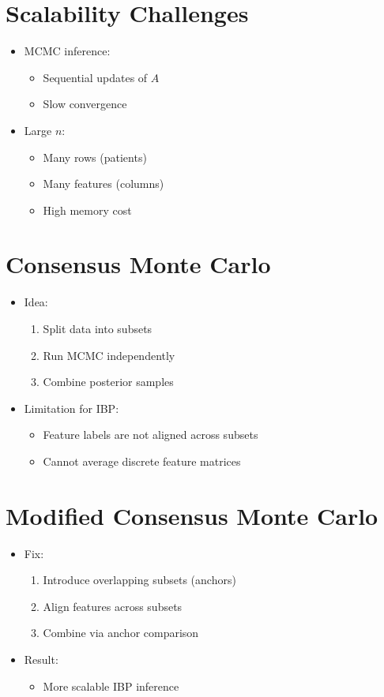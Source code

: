 \documentclass[12pt,oneside]{book}
\numberwithin{equation}{section}
\theoremstyle{definition}
\theoremstyle{plain}
\theoremstyle{remark}
\begin{document}
\section{Scalability Challenges}

\begin{itemize}
\item MCMC inference:
\begin{itemize}
\item Sequential updates of $A$
\item Slow convergence
\end{itemize}

\item Large $n$:
\begin{itemize}
\item Many rows (patients)
\item Many features (columns)
\item High memory cost
\end{itemize}
\end{itemize}

\section{Consensus Monte Carlo}

\begin{itemize}
\item Idea:
\begin{enumerate}
\item Split data into subsets
\item Run MCMC independently
\item Combine posterior samples
\end{enumerate}

\item Limitation for IBP:
\begin{itemize}
\item Feature labels are not aligned across subsets
\item Cannot average discrete feature matrices
\end{itemize}
\end{itemize}

\section{Modified Consensus Monte Carlo}

\begin{itemize}
\item Fix:
\begin{enumerate}
\item Introduce overlapping subsets (anchors)
\item Align features across subsets
\item Combine via anchor comparison
\end{enumerate}

\item Result:
\begin{itemize}
\item More scalable IBP inference
\end{itemize}
\end{itemize}
\end{document}
